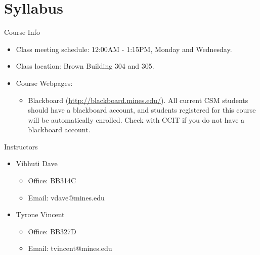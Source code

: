 \section{Syllabus}

\begin{frame}{Course Info}
\begin{itemize}
\item Class meeting schedule: 12:00AM - 1:15PM, Monday and Wednesday. 
\item Class location: Brown Building 304 and 305. 
\item Course Webpages:
\begin{itemize}
\item Blackboard (\url{http://blackboard.mines.edu/}). All current CSM students should have a blackboard account, and students registered for this course will be automatically enrolled. Check with CCIT if you do not have a blackboard account.
\end{itemize}
\end{itemize}
\end{frame}

\begin{frame}{Instructors}
  \begin{itemize}
  \item Vibhuti Dave
  \begin{itemize}
  \item Office: BB314C
  \item Email: vdave@mines.edu
  \end{itemize}
  \item Tyrone Vincent
    \begin{itemize}
  \item Office: BB327D
  \item Email: tvincent@mines.edu
  \end{itemize}
  \end{itemize}
\end{frame}

